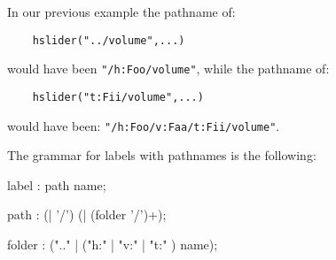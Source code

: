 In our previous example the pathname of:
\begin{lstlisting}
	hslider("../volume",...)
\end{lstlisting}
would have been \lstinline'"/h:Foo/volume"', while the pathname of:
\begin{lstlisting}
	hslider("t:Fii/volume",...)
\end{lstlisting}
would have been:
\lstinline'"/h:Foo/v:Faa/t:Fii/volume"'.

The grammar for labels with pathnames is the following:

\begin{rail}
	label : path name;
\end{rail}

\begin{rail}
	path : (| '/') (| (folder '/')+);
\end{rail}

\begin{rail}
	folder : (".." | ("h:" | "v:" | "t:" ) name);
\end{rail}

